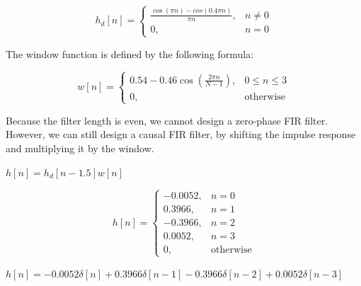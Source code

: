 \documentclass[fleqn]{article}
\begin{document}
\begin{enumerate}[nolistsep]
		\begin{equation*}
			h_d[n] =
			\begin{cases}
				\frac{\cos{({\pi}n)} - cos{(0.4{\pi}n)}}{{\pi}n}, & n \neq 0 \\
				0, & n = 0
			\end{cases}
		\end{equation*}
		
		The window function is defined by the following formula:
		
		\begin{equation*}
			w[n] =
			\begin{cases}
				0.54 - 0.46\cos{\left(\frac{2{\pi}n}{N - 1}\right)}, & 0 \leq n \leq 3 \\
				0, & \text{otherwise}
			\end{cases}
		\end{equation*}
		
		Because the filter length is even, we cannot design a zero-phase FIR filter. However, we can still design a causal FIR filter, by shifting the impulse response and multiplying it by the window.
		
		$h[n] = h_d[n - 1.5]w[n]$
		
		\begin{equation*}
			h[n] =
			\begin{cases}
				-0.0052, & n = 0 \\
				0.3966, & n = 1 \\
				-0.3966, & n = 2 \\
				0.0052, & n = 3\\
				0, & \text{otherwise}
			\end{cases}
		\end{equation*}
			
		$h[n] = -0.0052\delta[n] + 0.3966\delta[n-1] - 0.3966\delta[n-2] + 0.0052\delta[n-3]$
		
		
	\end{enumerate}
\end{document}
